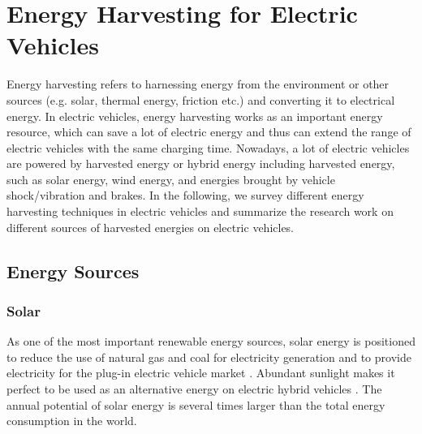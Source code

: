 \section{Energy Harvesting for Electric Vehicles} \label{sec:harvesting}

Energy harvesting refers to harnessing energy from the environment or other sources (e.g. solar, thermal energy, friction etc.) and converting it to electrical energy.
In electric vehicles, energy harvesting works as an important energy resource, which can save a lot of electric energy and thus can extend the range of electric vehicles with the same charging time.
Nowadays, a lot of electric vehicles are powered by harvested energy or hybrid energy including harvested energy, such as solar energy, wind energy, and energies brought by vehicle shock/vibration and brakes.
In the following, we survey different energy harvesting techniques in electric vehicles and summarize the research work on different sources of harvested energies on electric vehicles.

\subsection{Energy Sources}

\subsubsection{Solar}

As one of the most important renewable energy sources, solar energy is positioned to reduce the use of natural gas and coal for electricity generation and to provide electricity for the plug-in electric vehicle market \cite{JX_fthenakis2009technical}.
Abundant sunlight makes it perfect to be used as an alternative energy on electric hybrid vehicles \cite{JX_singh2012study, JX_bourgeois2015harvesting}.
The annual potential of solar energy is several times larger than the total energy consumption in the world.


